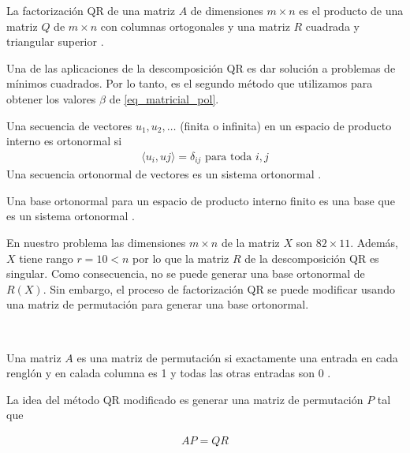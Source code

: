 \begin{definition}
La factorización QR de una matriz $A$ de dimensiones $m \times n$ es el producto de una matriz $Q$ de $m \times n$ con columnas ortogonales y una matriz $R$ cuadrada y triangular superior \cite{garcia2017second}. 
\end{definition}

Una de las aplicaciones de la descomposición QR es dar solución a problemas de mínimos cuadrados. Por lo tanto, es el segundo método que utilizamos para obtener los valores $\beta$ de \ref{eq_matricial_pol}.

 \begin{definition}
 Una secuencia de vectores $u_1, u_2, \dots$ (finita o infinita) en un espacio de producto interno es ortonormal si 
 \begin{equation*}
     \begin{aligned}
     \langle u_i , uj \rangle = \delta_{ij} \text{ para toda $i, j$}
     \end{aligned}
 \end{equation*}
 Una secuencia ortonormal de vectores es un sistema ortonormal \cite{garcia2017second}.
 \end{definition}

\begin{definition}
Una base ortonormal para un espacio de producto interno finito es una base que es un sistema ortonormal \cite{garcia2017second}.
\end{definition}

En nuestro problema las dimensiones $m \times n$ de la matriz $X$ son $82 \times 11$. Además, $X$ tiene rango $r = 10 < n$ por lo que la matriz $R$ de la descomposición QR es singular. Como consecuencia, no se puede generar una base ortonormal de $R(X)$. Sin embargo, el proceso de factorización QR se puede modificar usando una matriz de permutación para generar una base ortonormal.

\\

\begin{definition}
Una matriz $A$ es una matriz de permutación si exactamente una entrada en cada renglón y en calada columna es 1 y todas las otras entradas son 0 \cite{garcia2017second}.
\end{definition}

La idea del método QR modificado es generar una matriz de permutación $P$ tal que 

\begin{equation*}
    \begin{aligned}
    AP = QR
    \end{aligned}
\end{equation*}

